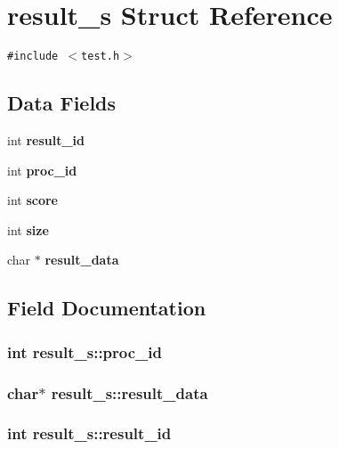 \section{result\_\-s Struct Reference}
\label{structresult__s}
{\tt \#include $<$test.h$>$}

\subsection*{Data Fields}
\begin{CompactItemize}
\item 
int \bf{result\_\-id}
\item 
int \bf{proc\_\-id}
\item 
int \bf{score}
\item 
int \bf{size}
\item 
char $\ast$ \bf{result\_\-data}
\end{CompactItemize}


\subsection{Field Documentation}
\subsubsection{\setlength{\rightskip}{0pt plus 5cm}int \bf{result\_\-s::proc\_\-id}}\label{structresult__s_9cbd8bb45b07e4ac6a165e46f47ca2d3}


\subsubsection{\setlength{\rightskip}{0pt plus 5cm}char$\ast$ \bf{result\_\-s::result\_\-data}}\label{structresult__s_aebe939ea61b94a9d76f50f6009d1040}


\subsubsection{\setlength{\rightskip}{0pt plus 5cm}int \bf{result\_\-s::result\_\-id}}\label{structresult__s_9c575cd4429ac802ad742bbfe637abb6}


